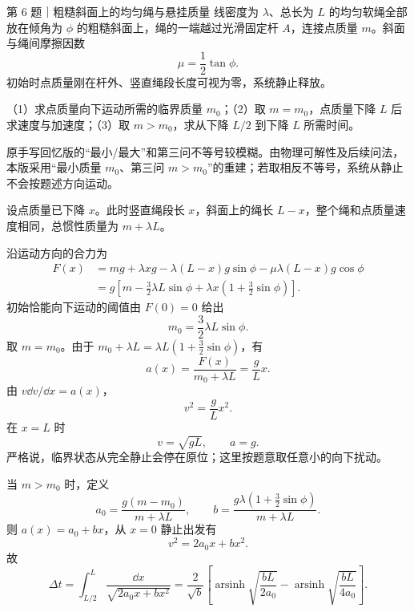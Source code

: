 \begin{problem}{第 6 题｜粗糙斜面上的均匀绳与悬挂质量}
线密度为 $\lambda$、总长为 $L$ 的均匀软绳全部放在倾角为 $\phi$ 的粗糙斜面上，绳的一端越过光滑固定杆 $A$，连接点质量 $m$。斜面与绳间摩擦因数
\[
\mu=\frac12\tan\phi.
\]
初始时点质量刚在杆外、竖直绳段长度可视为零，系统静止释放。

（1）求点质量向下运动所需的临界质量 $m_0$；（2）取 $m=m_0$，点质量下降 $L$ 后求速度与加速度；（3）取 $m>m_0$，求从下降 $L/2$ 到下降 $L$ 所需时间。
\FigRopeIncline
\end{problem}
\begin{identification}
原手写回忆版的“最小/最大”和第三问不等号较模糊。由物理可解性及后续问法，本版采用“最小质量 $m_0$、第三问 $m>m_0$”的重建；若取相反不等号，系统从静止不会按题述方向运动。
\end{identification}
\begin{solution}
设点质量已下降 $x$。此时竖直绳段长 $x$，斜面上的绳长 $L-x$，整个绳和点质量速度相同，总惯性质量为 $m+\lambda L$。

沿运动方向的合力为
\begin{align*}
F(x)&=mg+\lambda xg
-\lambda(L-x)g\sin\phi
-\mu\lambda(L-x)g\cos\phi\\
&=g\left[m-\frac32\lambda L\sin\phi
+\lambda x\left(1+\frac32\sin\phi\right)\right].
\end{align*}
初始恰能向下运动的阈值由 $F(0)=0$ 给出
\[
\boxed{m_0=\frac32\lambda L\sin\phi}.
\]
取 $m=m_0$。由于 $m_0+\lambda L=\lambda L(1+\frac32\sin\phi)$，有
\[
a(x)=\frac{F(x)}{m_0+\lambda L}=\frac{g}{L}x.
\]
由 $v\dd v/\dd x=a(x)$，
\[
v^2=\frac gLx^2.
\]
在 $x=L$ 时
\[
\boxed{v=\sqrt{gL},\qquad a=g}.
\]
严格说，临界状态从完全静止会停在原位；这里按题意取任意小的向下扰动。

当 $m>m_0$ 时，定义
\[
a_0=\frac{g(m-m_0)}{m+\lambda L},
\qquad
b=\frac{g\lambda(1+\frac32\sin\phi)}{m+\lambda L}.
\]
则 $a(x)=a_0+bx$，从 $x=0$ 静止出发有
\[
v^2=2a_0x+bx^2.
\]
故
\[
\Delta t=\int_{L/2}^{L}\frac{\dd x}{\sqrt{2a_0x+bx^2}}
=\frac{2}{\sqrt b}\left[
\operatorname{arsinh}\sqrt{\frac{bL}{2a_0}}
-\operatorname{arsinh}\sqrt{\frac{bL}{4a_0}}
\right].
\]
\end{solution}

